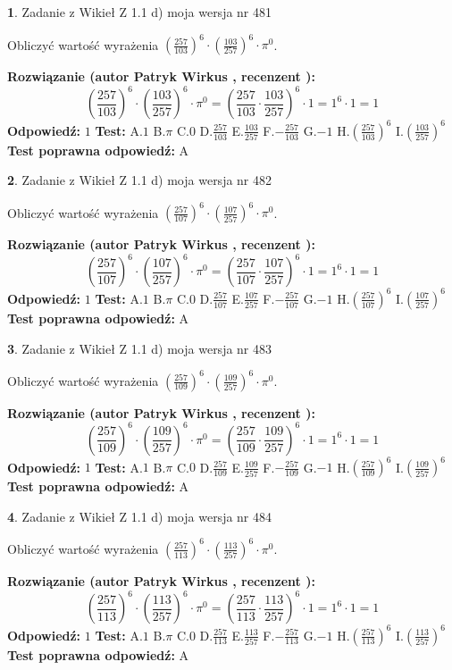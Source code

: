 \documentclass[12pt, a4paper]{article}
\theoremstyle{definition} %
\newtheorem{zad}{}
\newcommand{\zadStart}[1]{\begin{zad}#1\newline}
\newcommand{\zadStop}{\end{zad}}
\newcommand{\rozwStart}[2]{\noindent \textbf{Rozwiązanie (autor #1 , recenzent #2): }\newline}
\newcommand{\rozwStop}{\newline}
\newcommand{\odpStart}{\noindent \textbf{Odpowiedź:}\newline}
\newcommand{\odpStop}{\newline}
\newcommand{\testStart}{\noindent \textbf{Test:}\newline}
\newcommand{\testStop}{\newline}
\newcommand{\kluczStart}{\noindent \textbf{Test poprawna odpowiedź:}\newline}
\newcommand{\kluczStop}{\newline}
\begin{document}
\zadStart{Zadanie z Wikieł Z 1.1 d) moja wersja nr 481}

Obliczyć wartość wyrażenia $(\frac{257}{103})^{6} \cdot (\frac{103}{257})^{6} \cdot \pi^{0}$.
\zadStop
\rozwStart{Patryk Wirkus}{}
$$(\frac{257}{103})^{6} \cdot (\frac{103}{257})^{6} \cdot \pi^{0} = (\frac{257}{103} \cdot \frac{103}{257})^{6} \cdot 1 = 1^{6} \cdot 1 = 1$$
\rozwStop
\odpStart
$1$
\odpStop
\testStart
A.$1$ B.$\pi$ C.$0$ D.$\frac{257}{103}$ E.$\frac{103}{257}$
F.$-\frac{257}{103}$ G.$-1$
H.$(\frac{257}{103})^{6}$
I.$(\frac{103}{257})^{6}$
\testStop
\kluczStart
A
\kluczStop



\zadStart{Zadanie z Wikieł Z 1.1 d) moja wersja nr 482}

Obliczyć wartość wyrażenia $(\frac{257}{107})^{6} \cdot (\frac{107}{257})^{6} \cdot \pi^{0}$.
\zadStop
\rozwStart{Patryk Wirkus}{}
$$(\frac{257}{107})^{6} \cdot (\frac{107}{257})^{6} \cdot \pi^{0} = (\frac{257}{107} \cdot \frac{107}{257})^{6} \cdot 1 = 1^{6} \cdot 1 = 1$$
\rozwStop
\odpStart
$1$
\odpStop
\testStart
A.$1$ B.$\pi$ C.$0$ D.$\frac{257}{107}$ E.$\frac{107}{257}$
F.$-\frac{257}{107}$ G.$-1$
H.$(\frac{257}{107})^{6}$
I.$(\frac{107}{257})^{6}$
\testStop
\kluczStart
A
\kluczStop



\zadStart{Zadanie z Wikieł Z 1.1 d) moja wersja nr 483}

Obliczyć wartość wyrażenia $(\frac{257}{109})^{6} \cdot (\frac{109}{257})^{6} \cdot \pi^{0}$.
\zadStop
\rozwStart{Patryk Wirkus}{}
$$(\frac{257}{109})^{6} \cdot (\frac{109}{257})^{6} \cdot \pi^{0} = (\frac{257}{109} \cdot \frac{109}{257})^{6} \cdot 1 = 1^{6} \cdot 1 = 1$$
\rozwStop
\odpStart
$1$
\odpStop
\testStart
A.$1$ B.$\pi$ C.$0$ D.$\frac{257}{109}$ E.$\frac{109}{257}$
F.$-\frac{257}{109}$ G.$-1$
H.$(\frac{257}{109})^{6}$
I.$(\frac{109}{257})^{6}$
\testStop
\kluczStart
A
\kluczStop



\zadStart{Zadanie z Wikieł Z 1.1 d) moja wersja nr 484}

Obliczyć wartość wyrażenia $(\frac{257}{113})^{6} \cdot (\frac{113}{257})^{6} \cdot \pi^{0}$.
\zadStop
\rozwStart{Patryk Wirkus}{}
$$(\frac{257}{113})^{6} \cdot (\frac{113}{257})^{6} \cdot \pi^{0} = (\frac{257}{113} \cdot \frac{113}{257})^{6} \cdot 1 = 1^{6} \cdot 1 = 1$$
\rozwStop
\odpStart
$1$
\odpStop
\testStart
A.$1$ B.$\pi$ C.$0$ D.$\frac{257}{113}$ E.$\frac{113}{257}$
F.$-\frac{257}{113}$ G.$-1$
H.$(\frac{257}{113})^{6}$
I.$(\frac{113}{257})^{6}$
\testStop
\kluczStart
A
\kluczStop
\end{document}
